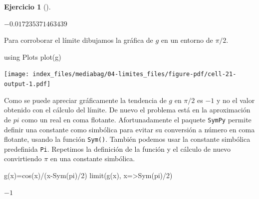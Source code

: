 \documentclass[
  a4paper,
]{scrreport}
\newenvironment{Shaded}{\begin{snugshade}}{\end{snugshade}}
\newcommand{\BuiltInTok}[1]{\textcolor[rgb]{0.00,0.23,0.31}{#1}}
\newcommand{\ConstantTok}[1]{\textcolor[rgb]{0.56,0.35,0.01}{#1}}
\newcommand{\FloatTok}[1]{\textcolor[rgb]{0.68,0.00,0.00}{#1}}
\newcommand{\FunctionTok}[1]{\textcolor[rgb]{0.28,0.35,0.67}{#1}}
\newcommand{\ImportTok}[1]{\textcolor[rgb]{0.00,0.46,0.62}{#1}}
\newcommand{\NormalTok}[1]{\textcolor[rgb]{0.00,0.23,0.31}{#1}}
\newcommand{\OperatorTok}[1]{\textcolor[rgb]{0.37,0.37,0.37}{#1}}
\theoremstyle{definition}
\newtheorem{exercise}{Ejercicio}[chapter]
\theoremstyle{remark}
\begin{document}
\begin{exercise}[]
\begin{enumerate}
\begin{tcolorbox}
  $-0.017235371463439$

  Para corroborar el límite dibujamos la gráfica de \(g\) en un entorno
  de \(\pi/2\).

\begin{Shaded}
\begin{Highlighting}[]
\ImportTok{using} \BuiltInTok{Plots}
\FunctionTok{plot}\NormalTok{(g)}
\end{Highlighting}
\end{Shaded}

  \texttt{[image: index\_files/mediabag/04-limites\_files/figure-pdf/cell-21-output-1.pdf]}

  Como se puede apreciar gráficamente la tendencia de \(g\) en \(\pi/2\)
  es \(-1\) y no el valor obtenido con el cálculo del límite. De nuevo
  el problema está en la aproximación de \(pi\) como un real en coma
  flotante. Afortunadamente el paquete \texttt{SymPy} permite definir
  una constante como simbólica para evitar su conversión a número en
  coma flotante, usando la función \texttt{Sym()}. También podemos usar
  la constante simbólica predefinida \texttt{Pi}. Repetimos la
  definición de la función y el cálculo de nuevo convirtiendo \(\pi\) en
  una constante simbólica.

\begin{Shaded}
\begin{Highlighting}[]
\FunctionTok{g}\NormalTok{(x)}\OperatorTok{=}\FunctionTok{cos}\NormalTok{(x)}\OperatorTok{/}\NormalTok{(}\FunctionTok{x{-}Sym}\NormalTok{(}\ConstantTok{pi}\NormalTok{)}\OperatorTok{/}\FloatTok{2}\NormalTok{)}
\FunctionTok{limit}\NormalTok{(}\FunctionTok{g}\NormalTok{(x), x}\OperatorTok{=\textgreater{}}\FunctionTok{Sym}\NormalTok{(}\ConstantTok{pi}\NormalTok{)}\OperatorTok{/}\FloatTok{2}\NormalTok{)}
\end{Highlighting}
\end{Shaded}

  $-1$

  \end{tcolorbox}
\end{enumerate}

\end{exercise}
\end{document}
